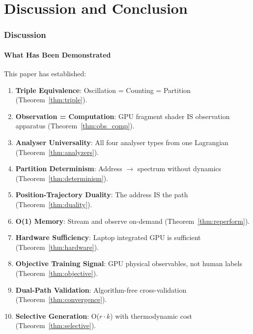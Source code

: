 \documentclass[11pt,twocolumn,a4paper]{article}
\theoremstyle{definition}
\theoremstyle{remark}
\begin{document}

\part{Discussion and Conclusion}

\section{Discussion}
\label{sec:discussion}

\subsection{What Has Been Demonstrated}

This paper has established:
\begin{enumerate}[nosep]
\item \textbf{Triple Equivalence}: Oscillation = Counting = Partition (Theorem~\ref{thm:triple}).
\item \textbf{Observation = Computation}: GPU fragment shader IS observation apparatus (Theorem~\ref{thm:obs_comp}).
\item \textbf{Analyser Universality}: All four analyser types from one Lagrangian (Theorem~\ref{thm:analyzers}).
\item \textbf{Partition Determinism}: Address $\to$ spectrum without dynamics (Theorem~\ref{thm:determinism}).
\item \textbf{Position-Trajectory Duality}: The address IS the path (Theorem~\ref{thm:duality}).
\item \textbf{O(1) Memory}: Stream and observe on-demand (Theorem~\ref{thm:reperform}).
\item \textbf{Hardware Sufficiency}: Laptop integrated GPU is sufficient (Theorem~\ref{thm:hardware}).
\item \textbf{Objective Training Signal}: GPU physical observables, not human labels (Theorem~\ref{thm:objective}).
\item \textbf{Dual-Path Validation}: Algorithm-free cross-validation (Theorem~\ref{thm:convergence}).
\item \textbf{Selective Generation}: O($r \cdot k$) with thermodynamic cost (Theorem~\ref{thm:selective}).
\end{enumerate}
\end{document}
